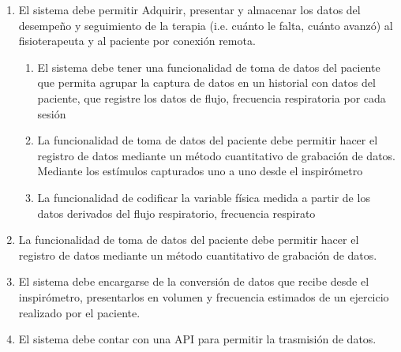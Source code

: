 \documentclass[12pt]{article}
\begin{document}
\begin{enumerate}[start=1,label={\bfseries RF0\arabic*.}]
\begin{enumerate}[label*=\arabic*.]
 
     
         
    
 
    
    
    \item El sistema debe permitir Adquirir, presentar y almacenar los datos del desempeño y seguimiento de la terapia (i.e. cuánto le falta, cuánto avanzó) al fisioterapeuta y al paciente por conexión remota.
     \label{RF01}
            \begin{enumerate}[label*=\arabic*.]
                
                \item El sistema debe tener una funcionalidad de toma de datos del paciente que permita agrupar la captura de datos en un historial con datos del paciente, que registre los datos de flujo, frecuencia respiratoria por cada sesión 
                
                \item La funcionalidad de toma de datos del paciente debe permitir hacer el registro de datos mediante un método cuantitativo de grabación de datos. Mediante los estímulos capturados uno a uno desde el inspirómetro %
                
                \item La funcionalidad de codificar la variable física medida a partir de los datos derivados del flujo respiratorio, frecuencia respirato %
            
            \end{enumerate}
            
    \item La funcionalidad de toma de datos del paciente debe permitir hacer el registro de datos mediante un método cuantitativo de grabación de datos.
            
        
    \item El sistema debe encargarse de la conversión de datos que recibe desde el inspirómetro, presentarlos en volumen y frecuencia estimados de un ejercicio realizado por el paciente.
       

    
    
    \item El sistema debe contar con una API para permitir la trasmisión de datos.
    

\end{enumerate}
\end{enumerate}
\end{document}
